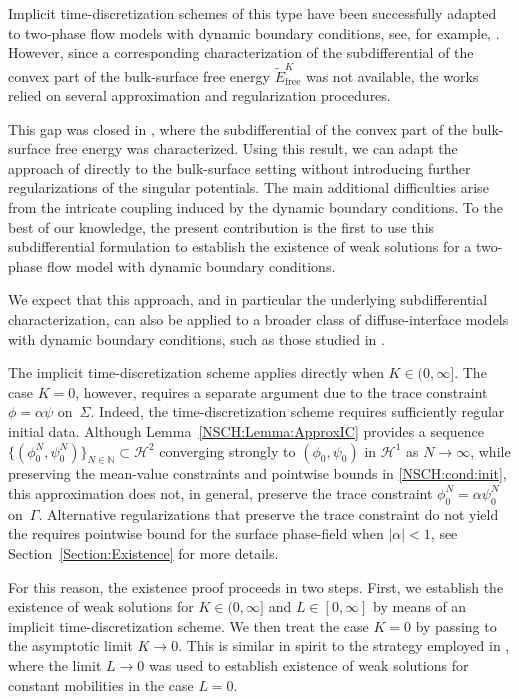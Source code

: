 \documentclass[11pt,reqno]{amsart}
\theoremstyle{remark}
\numberwithin{equation}{section}
\newcommand{\abs}[1]{|#1|}
\newcommand{\N}{\mathbb N}
\newcommand{\Ga}{\Gamma}
\newcommand{\free}{\mathrm{free}}
\begin{document}
Implicit time-discretization schemes of this type have been successfully adapted to two-phase flow models with dynamic boundary conditions, see, for example, \cite{Gal2019, Gal2024}. However, since a corresponding characterization of the subdifferential of the convex part of the bulk-surface free energy $\widetilde E_\free^K$ was not available, the works relied on several approximation and regularization procedures.

This gap was closed in \cite{Giorgini2026}, where the subdifferential of the convex part of the bulk-surface free energy was characterized. Using this result, we can adapt the approach of \cite{Abels2013} directly to the bulk-surface setting without introducing further regularizations of the singular potentials. The main additional difficulties arise from the intricate coupling induced by the dynamic boundary conditions. To the best of our knowledge, the present contribution is the first to use this subdifferential formulation to establish the existence of weak solutions for a two-phase flow model with dynamic boundary conditions.

We expect that this approach, and in particular the underlying subdifferential characterization, can also be applied to a broader class of diffuse-interface models with dynamic boundary conditions, such as those studied in \cite{Giorgini2023, Gal2016, Gal2019, Gal2023, Gal2024, Chan2025}.

The implicit time-discretization scheme applies directly when $K\in(0,\infty]$. The case $K = 0$, however, requires a separate argument due to the trace constraint $\phi = \alpha\psi$ on~$\Sigma$. Indeed, the time-discretization scheme requires sufficiently regular initial data. Although Lemma~\ref{NSCH:Lemma:ApproxIC} provides a sequence $\{(\phi_0^N,\psi_0^N)\}_{N\in\N}\subset\mathcal{H}^2$ converging strongly to $(\phi_0,\psi_0)$ in $\mathcal{H}^1$ as $N\rightarrow\infty$, while preserving the mean-value constraints and pointwise bounds in \eqref{NSCH:cond:init}, this approximation does not, in general, preserve the trace constraint
$\phi_0^N = \alpha\psi_0^N$ on~$\Ga$. Alternative regularizations that preserve the trace constraint do not yield the requires pointwise bound for the surface phase-field when $\abs{\alpha} < 1$, see Section~\ref{Section:Existence} for more details.

For this reason, the existence proof proceeds in two steps. First, we establish the existence of weak solutions for $K\in(0,\infty]$ and $L\in[0,\infty]$ by means of an implicit time-discretization scheme. We then treat the case $K = 0$ by passing to the asymptotic limit $K\rightarrow 0$. This is similar in spirit to the strategy employed in \cite{Knopf2025a}, where the limit $L\rightarrow 0$ was used to establish existence of weak solutions for constant mobilities in the case $L = 0$.
\end{document}
